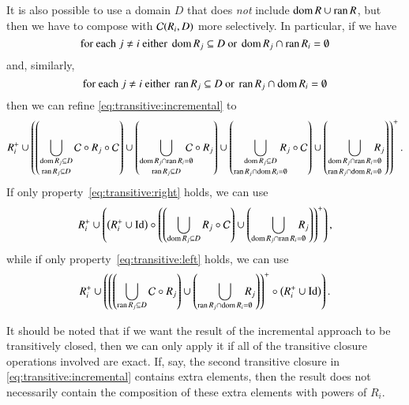 It is also possible to use a domain $D$ that does {\em not\/}
include $\mathop{\rm dom}\nolimits R \cup \mathop{\rm ran}\nolimits R$, but then we have to
compose with ${\cal C}(R_i,D)$ more selectively.
In particular, if we have
\begin{equation}
\label{eq:transitive:right}
\text{for each $j \ne i$ either }
\mathop{\rm dom}\nolimits R_j \subseteq D \text{ or } \mathop{\rm dom}\nolimits R_j \cap \mathop{\rm ran}\nolimits R_i = \emptyset
\end{equation}
and, similarly,
\begin{equation}
\label{eq:transitive:left}
\text{for each $j \ne i$ either }
\mathop{\rm ran}\nolimits R_j \subseteq D \text{ or } \mathop{\rm ran}\nolimits R_j \cap \mathop{\rm dom}\nolimits R_i = \emptyset
\end{equation}
then we can refine \eqref{eq:transitive:incremental} to
$$
R_i^+ \cup
\left(
\left(
\bigcup_{\shortstack{$\scriptstyle\domain R_j \subseteq D $\\
		     $\scriptstyle\range R_j \subseteq D$}}
{\cal C} \circ R_j \circ {\cal C}
\right)
\cup
\left(
\bigcup_{\shortstack{$\scriptstyle\domain R_j \cap \range R_i = \emptyset$\\
		     $\scriptstyle\range R_j \subseteq D$}}
\!\!\!\!\!
{\cal C} \circ R_j
\right)
\cup
\left(
\bigcup_{\shortstack{$\scriptstyle\domain R_j \subseteq D $\\
		     $\scriptstyle\range R_j \cap \domain R_i = \emptyset$}}
\!\!\!\!\!
R_j \circ {\cal C}
\right)
\cup
\left(
\bigcup_{\shortstack{$\scriptstyle\domain R_j \cap \range R_i = \emptyset$\\
		     $\scriptstyle\range R_j \cap \domain R_i = \emptyset$}}
\!\!\!\!\!
R_j
\right)
\right)^+
.
$$
If only property~\eqref{eq:transitive:right} holds,
we can use
$$
R_i^+ \cup
\left(
\left(
R_i^+ \cup \identity
\right)
\circ
\left(
\left(
\bigcup_{\shortstack{$\scriptstyle\domain R_j \subseteq D $}}
R_j \circ {\cal C}
\right)
\cup
\left(
\bigcup_{\shortstack{$\scriptstyle\domain R_j \cap \range R_i = \emptyset$}}
\!\!\!\!\!
R_j
\right)
\right)^+
\right)
,
$$
while if only property~\eqref{eq:transitive:left} holds,
we can use
$$
R_i^+ \cup
\left(
\left(
\left(
\bigcup_{\shortstack{$\scriptstyle\range R_j \subseteq D $}}
{\cal C} \circ R_j
\right)
\cup
\left(
\bigcup_{\shortstack{$\scriptstyle\range R_j \cap \domain R_i = \emptyset$}}
\!\!\!\!\!
R_j
\right)
\right)^+
\circ
\left(
R_i^+ \cup \identity
\right)
\right)
.
$$

It should be noted that if we want the result of the incremental
approach to be transitively closed, then we can only apply it
if all of the transitive closure operations involved are exact.
If, say, the second transitive closure in \eqref{eq:transitive:incremental}
contains extra elements, then the result does not necessarily contain
the composition of these extra elements with powers of $R_i$.

